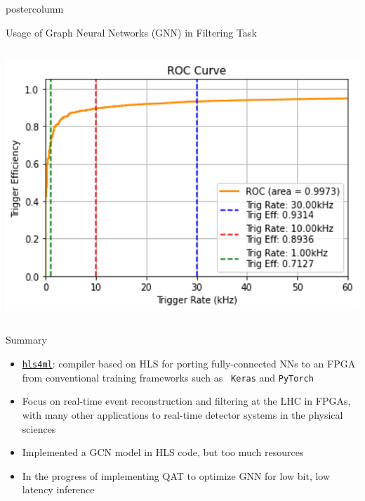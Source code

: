\documentclass[final,hyperref={pdfpagelabels=false}]{beamer}
\newcommand{\hlsfml}{{\href{https://github.com/hls-fpga-machine-learning/hls4ml}{\texttt{hls4ml}}}}
\begin{document}
\begin{frame}
\begin{columns}
\begin{column}{.49\textwidth}
\begin{beamercolorbox}[center,wd=\textwidth]{postercolumn}
\begin{minipage}[T]{.95\textwidth}
{\begin{block}{Usage of Graph Neural Networks (GNN) in Filtering Task}
\begin{columns}
\begin{column}{.49\textwidth}
             \begin{center}
                    \includegraphics[width=\linewidth]{gnn_roc.png}
                  \end{center}
                \end{column}
                \end{columns}
              \end{block}
            
            \begin{block}{Summary}
                  \begin{itemize}
                    \item \hlsfml: compiler based on HLS for porting
                      fully-connected NNs to an FPGA from
                      conventional training frameworks such as {\tt
                        Keras} and {\tt PyTorch}
                      \item Focus on real-time
                        event reconstruction and filtering at the LHC
                        in FPGAs, with many other applications to real-time detector systems in the physical
                        sciences 
                        \item  Implemented a GCN model in HLS code, but too much resources
                        \item In the progress of implementing QAT to optimize GNN for low bit, low latency inference
                          \end{itemize}
                          \begin{flushright}\vspace{-3ex}
                          \end{flushright}
                  \end{block}  
              
}
\end{minipage}
\end{beamercolorbox}
\end{column}
\end{columns}
\end{frame}
\end{document}
